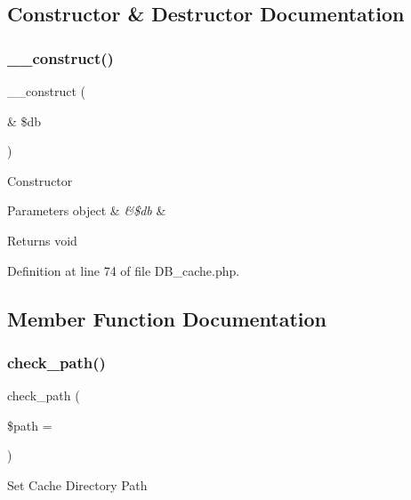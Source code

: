 \subsection{Constructor \& Destructor Documentation}
\mbox{\label{class_c_i___d_b___cache_aaf2ef772755ec6f361d44e16cc9ffd69}} 
\subsubsection{\texorpdfstring{\_\_construct()}{\_\_construct()}}
{\footnotesize\ttfamily \+\_\+\+\_\+construct (\begin{DoxyParamCaption}\item[{\&}]{\$db }\end{DoxyParamCaption})}

Constructor


\begin{DoxyParams}[1]{Parameters}
object & {\em \&\$db} & \\
\hline
\end{DoxyParams}
\begin{DoxyReturn}{Returns}
void 
\end{DoxyReturn}


Definition at line 74 of file D\+B\+\_\+cache.\+php.



\subsection{Member Function Documentation}
\mbox{\label{class_c_i___d_b___cache_adb73b6f91025d00c565d228c4f611f41}} 
\subsubsection{\texorpdfstring{check\_path()}{check\_path()}}
{\footnotesize\ttfamily check\+\_\+path (\begin{DoxyParamCaption}\item[{}]{\$path = {\ttfamily \textquotesingle{}\textquotesingle{}} }\end{DoxyParamCaption})}

Set Cache Directory Path



